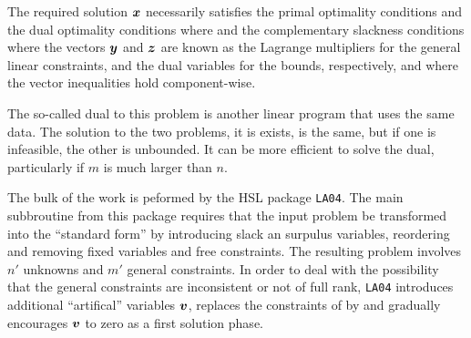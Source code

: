 \documentclass{galahad}
\begin{document}

\galmethod
The required solution ${\bm{x}}$ necessarily satisfies
the primal optimality conditions
and
the dual optimality conditions
where
and the complementary slackness conditions
where the vectors ${\bm{y}}$ and ${\bm{z}}$ are known as the Lagrange multipliers for
the general linear constraints, and the dual variables for the bounds,
respectively, and where the vector inequalities hold component-wise.

The so-called dual to this problem is another linear program
that uses the same data. The solution to the two problems, it is exists,
is the same, but if one is infeasible, the other is unbounded. It can be
more efficient to solve the dual, particularly if $m$ is much larger than $n$.

The bulk of the work is peformed by the HSL package {\tt LA04}. The
main subbroutine from this package requires that the input problem
be transformed into the ``standard form''
by introducing slack an surpulus variables, reordering and
removing fixed variables and free constraints. The resulting
problem involves $n'$ unknowns and $m'$ general constraints.
In order to deal with the possibility that the general constraints
are inconsistent or not of full rank,
{\tt LA04} introduces additional ``artifical'' variables ${\bm{v}}$, 
replaces the constraints of  by
and gradually encourages ${\bm{v}}$ to zero as a first solution phase.
\end{document}
